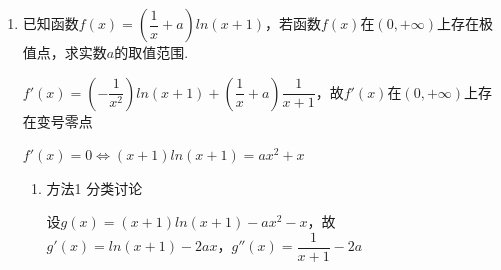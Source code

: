 \begin{enumerate}
\begin{enumerate}
\begin{jieda}
\begin{enumerate}
                \item 方法2 参变分离

                当$x = 1$时恒成立，参变分离有$a \geq \dfrac{xlnx}{x^2-1}(x > 1)$，设$f(x) = \dfrac{xlnx}{x^2-1}$，则$f'(x) = \dfrac{(lnx+1)(x^2-1)-2x^2lnx}{(x^2-1)^2} = \dfrac{x^2-1-(1+x^2)lnx}{(x^2-1)^2}$

                令$g(x) = x^2-1-(1+x^2)lnx$，$g'(x) = 2x-2xlnx-\dfrac{1+x^2}{x} = x-2xlnx-\dfrac{1}{x}$，$g''(x) = 1+\dfrac{1}{x^2}-2(lnx+1)$，$g'''(x) = -\dfrac{2}{x^3}-\dfrac{2}{x} < 0$，故$g''(x) < 0$，故$g'(x) < 0$，故$g(x) < 0$，故$f'(x) < 0$，根据洛必达法则可知$f(x) < \dfrac{1}{2}$，故$a \geq \dfrac{1}{2}$
            \end{enumerate}
        \end{jieda}
        \item 已知函数$f(x) = \left(\dfrac{1}{x}+a\right)ln(x+1)$，若函数$f(x)$在$(0, +\infty)$上存在极值点，求实数$a$的取值范围.
        \begin{jieda}
            $f'(x) = \left(-\dfrac{1}{x^2}\right)ln(x+1)+\left(\dfrac{1}{x}+a\right)\dfrac{1}{x+1}$，故$f'(x)$在$(0, +\infty)$上存在变号零点

            $f'(x) = 0 \Longleftrightarrow (x+1)ln(x+1) = ax^2+x$
            \begin{enumerate}
                \item 方法1 分类讨论

                设$g(x) = (x+1)ln(x+1) - ax^2-x$，故$g'(x) = ln(x+1) - 2ax$，$g''(x) = \dfrac{1}{x+1}-2a$

\end{enumerate}
\end{jieda}
\end{enumerate}
\end{enumerate}
